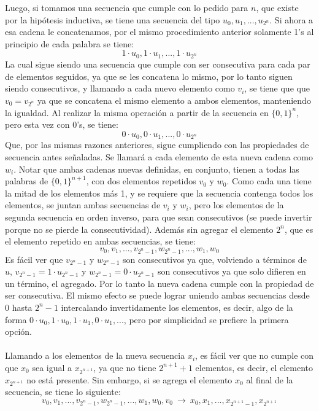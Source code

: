 \documentclass[letter]{article}
\begin{document}
\begin{pregunta}{2}
		Luego, si tomamos una secuencia que cumple con lo pedido para $n$, que existe por la hipótesis inductiva, se tiene una secuencia del tipo $u_0, u_1, ..., u_{2^n}$. Si ahora a esa cadena le concatenamos, por el mismo procedimiento anterior solamente 1's al principio de cada palabra se tiene:
		$$1\cdot u_0, 1\cdot u_1, ..., 1\cdot u_{2^n}$$
		La cual sigue siendo una secuencia que cumple con ser consecutiva para cada par de elementos seguidos, ya que se les concatena lo mismo, por lo tanto siguen siendo consecutivos, y llamando a cada nuevo elemento como $v_i$, se tiene que que $v_0 = v_{2^n}$ ya que se concatena el mismo elemento a ambos elementos, manteniendo la igualdad.
		Al realizar la misma operación a partir de la secuencia en $\{0,1\}^n$, pero esta vez con 0's, se tiene:
		$$0\cdot u_0, 0\cdot u_1, ..., 0\cdot u_{2^n}$$
		Que, por las mismas razones anteriores, sigue cumpliendo con las propiedades de secuencia antes señaladas. Se llamará a cada elemento de esta nueva cadena como $w_i$.
		Notar que ambas cadenas nuevas definidas, en conjunto, tienen a todas las palabras de $\{0,1\}^{n+1}$, con dos elementos repetidos $v_0$ y $w_0$. Como cada una tiene la mitad de los elementos más 1, y se requiere que la secuencia contenga todos los elementos, se juntan ambas secuencias de $v_i$ y $w_i$, pero los elementos de la segunda secuencia en orden inverso, para que sean consecutivos (se puede invertir porque no se pierde la consecutividad). Además sin agregar el elemento $2^n$, que es el elemento repetido en ambas secuencias, se tiene:
		$$v_0, v_1, ..., v_{2^n-1}, w_{2^n-1}, ..., w_1, w_0$$
		Es fácil ver que $v_{2^n-1}$ y $w_{2^n-1}$ son consecutivos ya que, volviendo a términos de $u$, $v_{2^n-1}=1\cdot u_{2^n-1}$ y $w_{2^n-1}=0\cdot u_{2^n-1}$ son consecutivos ya que solo difieren en un término, el agregado. Por lo tanto la nueva cadena cumple con la propiedad de ser consecutiva. El mismo efecto se puede lograr uniendo ambas secuencias desde 0 hasta $2^n-1$ intercalando invertidamente los elementos, es decir, algo de la forma $0\cdot u_0, 1\cdot u_0, 1\cdot u_1, 0\cdot u_1, ...$, pero por simplicidad se prefiere la primera opción.\\\\
		Llamando a los elementos de la nueva secuencia $x_i$, es fácil ver que no cumple con que $x_0$ sea igual a $x_{2^{n+1}}$, ya que no tiene $2^{n+1}+1$ elementos, es decir, el elemento $x_{2^{n+1}}$ no está presente. Sin embargo, si se agrega el elemento $x_0$ al final de la secuencia, se tiene lo siguiente:
		$$v_0, v_1, ..., v_{2^n-1}, w_{2^n-1}, ..., w_1, w_0, v_0 \ \rightarrow \ x_0, x_1, ..., x_{2^{n+1}-1}, x_{2^{n+1}}$$

\end{pregunta}
\end{document}

